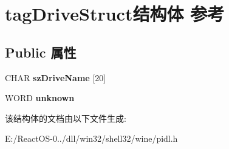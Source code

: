 \hypertarget{structtag_drive_struct}{}\section{tag\+Drive\+Struct结构体 参考}
\label{structtag_drive_struct}
\subsection*{Public 属性}
\begin{DoxyCompactItemize}
\item 
\mbox{\label{structtag_drive_struct_aa905a3eaefb5d9f2b6b0e0cab89b591f}} 
C\+H\+AR {\bfseries sz\+Drive\+Name} \mbox{[}20\mbox{]}
\item 
\mbox{\label{structtag_drive_struct_a288fd321ba3c6179c92f1cb1ad3339f5}} 
W\+O\+RD {\bfseries unknown}
\end{DoxyCompactItemize}


该结构体的文档由以下文件生成\+:\begin{DoxyCompactItemize}
\item 
E\+:/\+React\+O\+S-\/0../dll/win32/shell32/wine/pidl.\+h\end{DoxyCompactItemize}
